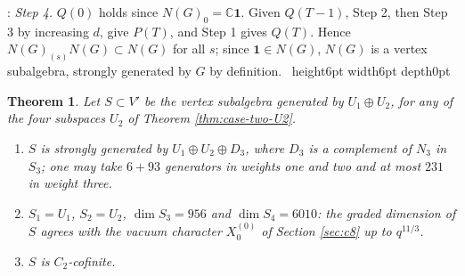\documentclass[leqno]{article}
\newcommand{\Cbb}{\ensuremath{\mathbb{C}}}
\newcommand{\qed}{\hfill \vrule height6pt  width6pt depth0pt}
\newtheorem{thm}{Theorem}[section]
\newenvironment{proof}[1][]{\noindent {\it Proof #1} : }{\hbox{~}\qed
\smallskip
}
\numberwithin{equation}{section}
\begin{document}
\begin{proof}
\emph{Step 4.} $Q(0)$ holds since $N(G)_0 = \Cbb\mathbf 1$. Given $Q(T-1)$, Step 2, then Step 3 by increasing $d$, give $P(T)$, and Step 1 gives $Q(T)$. Hence $N(G)_{(s)}N(G) \subset N(G)$ for all $s$; since $\mathbf 1 \in N(G)$, $N(G)$ is a vertex subalgebra, strongly generated by $G$ by definition.
\end{proof}

\begin{thm}
\label{thm:strong-generation}
Let $S \subset V'$ be the vertex subalgebra generated by $U_1 \oplus U_2$, for any of the four subspaces $U_2$ of Theorem \ref{thm:case-two-U2}.
\begin{enumerate}
\item $S$ is strongly generated by $U_1 \oplus U_2 \oplus D_3$, where $D_3$ is a complement of $N_3$ in $S_3$; one may take $6 + 93$ generators in weights one and two and at most $231$ in weight three.
\item $S_1 = U_1$, $S_2 = U_2$, $\dim S_3 = 956$ and $\dim S_4 = 6010$: the graded dimension of $S$ agrees with the vacuum character $X^{(0)}_0$ of Section \ref{sec:c8} up to $q^{11/3}$.
\item $S$ is $C_2$-cofinite.
\end{enumerate}
\end{thm}
\end{document}
